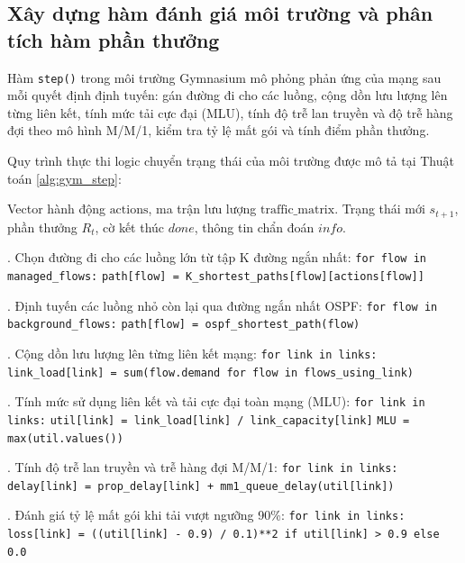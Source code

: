 \documentclass[11pt,a4paper]{article}
\begin{document}
\subsection{Xây dựng hàm đánh giá môi trường và phân tích hàm phần thưởng}
Hàm \texttt{step()} trong môi trường Gymnasium mô phỏng phản ứng của mạng sau mỗi quyết định định tuyến: gán đường đi cho các luồng, cộng dồn lưu lượng lên từng liên kết, tính mức tải cực đại (MLU), tính độ trễ lan truyền và độ trễ hàng đợi theo mô hình M/M/1, kiểm tra tỷ lệ mất gói và tính điểm phần thưởng.

Quy trình thực thi logic chuyển trạng thái của môi trường được mô tả tại Thuật toán \ref{alg:gym_step}:

\begin{algorithm}[H]
\caption{Quy trình một bước chuyển trạng thái (Gym Environment Step)}
\label{alg:gym_step}
\begin{algorithmic}[1]
\Require Vector hành động $\text{actions}$, ma trận lưu lượng $\text{traffic\_matrix}$.
\Ensure Trạng thái mới $s_{t+1}$, phần thưởng $R_t$, cờ kết thúc $done$, thông tin chẩn đoán $info$.

. Chọn đường đi cho các luồng lớn từ tập K đường ngắn nhất:
\State \quad \texttt{for flow in managed\_flows:}
\State \quad \quad \texttt{path[flow] = K\_shortest\_paths[flow][actions[flow]]}

. Định tuyến các luồng nhỏ còn lại qua đường ngắn nhất OSPF:
\State \quad \texttt{for flow in background\_flows:}
\State \quad \quad \texttt{path[flow] = ospf\_shortest\_path(flow)}

. Cộng dồn lưu lượng lên từng liên kết mạng:
\State \quad \texttt{for link in links:}
\State \quad \quad \texttt{link\_load[link] = sum(flow.demand for flow in flows\_using\_link)}

. Tính mức sử dụng liên kết và tải cực đại toàn mạng (MLU):
\State \quad \texttt{for link in links:}
\State \quad \quad \texttt{util[link] = link\_load[link] / link\_capacity[link]}
\State \quad \texttt{MLU = max(util.values())}

. Tính độ trễ lan truyền và trễ hàng đợi M/M/1:
\State \quad \texttt{for link in links:}
\State \quad \quad \texttt{delay[link] = prop\_delay[link] + mm1\_queue\_delay(util[link])}

. Đánh giá tỷ lệ mất gói khi tải vượt ngưỡng 90\%:
\State \quad \texttt{for link in links:}
\State \quad \quad \texttt{loss[link] = ((util[link] - 0.9) / 0.1)**2 if util[link] > 0.9 else 0.0}


\end{algorithmic}
\end{algorithm}
\end{document}
